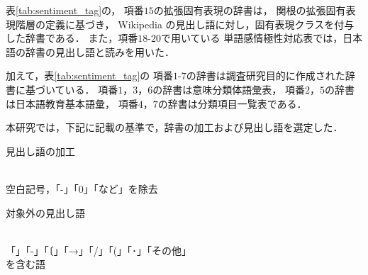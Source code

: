 \documentclass[12pt,a4paper,twocolumn,twoside]{jsik}
\begin{document}
表\ref{tab:sentiment_tag}の，
項番$15$の拡張固有表現の辞書は，
関根の拡張固有表現階層の定義に基づき，
Wikipedia の見出し語に対し，固有表現クラスを付与した辞書である．
%
また，項番$18$-$20$で用いている
単語感情極性対応表では，日本語の辞書の見出し語と読みを用いた．

加えて，表\ref{tab:sentiment_tag}の
項番$1$-$7$の辞書は調査研究目的に作成された辞書に基づいている．
%
項番$1$，$3$，$6$の辞書は意味分類体語彙表，
項番$2$，$5$の辞書は日本語教育基本語彙，
項番$4$，$7$の辞書は分類項目一覧表である．
\newpage

%
本研究では，下記に記載の基準で，辞書の加工および見出し語を選定した．
%
\begin{enumerate}
{\bf \item 見出し語の加工}
\\空白記号，「-」「0」「など」を除去

{\bf \item 対象外の見出し語}
\\「」「-」「〔」「→」「/」「(」「･」「その他」\\を含む語
\end{enumerate}
\end{document}
